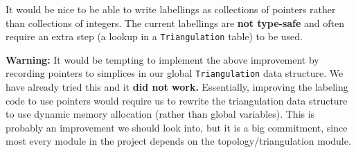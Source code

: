 \documentclass[12pt]{article}%
\begin{document}
It would be nice to be able to write labellings as collections of pointers rather than collections of integers. The current labellings are \textbf{not type-safe} and often require an extra step (a lookup in a \texttt{Triangulation} table) to be used.

\textbf{Warning:} It would be tempting to implement the above improvement by recording pointers to simplices in our global \texttt{Triangulation} data structure. We have already tried this and it \textbf{did not work.} Essentially, improving the labeling code to use pointers would require us to rewrite the triangulation data structure to use dynamic memory allocation (rather than global variables). This is probably an improvement we should look into, but it is a big commitment, since most every module in the project depends on the topology/triangulation module. 
    

%
\end{document}
